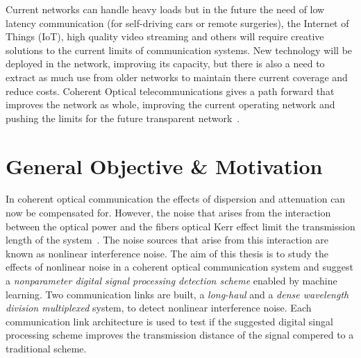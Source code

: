 Current networks can handle heavy loads but in the future the need of low latency communication (for self-driving cars or remote surgeries), the Internet of Things (IoT), high quality video streaming and others will require creative solutions to the current limits of communication systems.  New technology will be deployed in the network, improving its capacity, but there is also a need to extract as much use from older networks to maintain there current coverage and reduce costs. Coherent Optical telecommunications gives a path forward that improves the network as whole, improving the current operating network and pushing the limits for the future transparent network~\cite{ModForm,NetGenTransp}.

\section{General Objective \& Motivation}	
In coherent optical communication the effects of dispersion and attenuation can now be compensated for. However, the noise that arises from the interaction between the optical power and the fibers optical Kerr effect limit the transmission length of the system~\cite{NLPNinCFO}. The noise sources that arise from this interaction are known as nonlinear interference noise. The aim of this thesis is to study the effects of nonlinear noise in a coherent optical communication system and suggest a \textit{nonparameter digital signal processing detection scheme} enabled by machine learning. Two communication links are built, a \textit{long-haul} and a \textit{dense wavelength division multiplexed} system, to detect nonlinear interference noise. Each communication link architecture is used to test if the suggested digital singal processing scheme improves the transmission distance of the signal compered to a  traditional scheme.    


